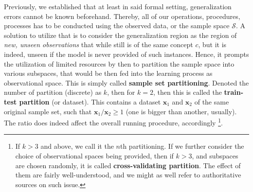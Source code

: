Previously, we established that at least in said formal setting, generalization errors cannot be known beforehand. Thereby, all of our operations, procedures, processes has to be conducted using the observed data, or the sample space $\mathcal{S}$. A solution to utilize that is to consider the generalization region as the region of \textit{new, unseen observations} that while still is of the same concept $c$, but it is indeed, unseen if the model is never provided of such instances. Hence, it prompts the utilization of limited resources by then to partition the sample space into various subspaces, that would be then fed into the learning process as observational space. This is simply called \textbf{sample set partitioning}. Denoted the number of partition (discrete) as $k$, then for $k=2$, then this is called the \textbf{train-test partition} (or dataset). This contains a dataset $\mathbf{x}_{1}$ and $\mathbf{x}_{2}$ of the same original sample set, such that $\mathbf{x}_{1}/\mathbf{x}_{2}\geq 1$ (one is bigger than another, usually). The ratio does indeed affect the overall running procedure, accordingly \footnote{If $k>3$ and above, we call it the $n$th partitioning. If we further consider the choice of observational spaces being provided, then if $k>3$, and subspaces are chosen randomly, it is called \textbf{cross-validating partition}. The effect of them are fairly well-understood, and we might as well refer to authoritative sources on such issue.}.

